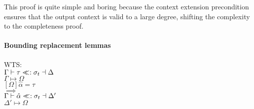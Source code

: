 \documentclass{article}
\newcommand{\alphahat}{\hat{\alpha}}
\newcommand{\sigbndr}{<\hspace{-5px}<:}
\begin{document}
This proof is quite simple and boring because the context extension precondition ensures that the output context is valid to a large degree, shifting the complexity to the completeness proof.

\paragraph{Bounding replacement lemmas}
\begin{tabbing}
WTS:\=\\
\>$\Gamma \vdash \tau \sigbndr \sigma_t \dashv \Delta$\\
\>$\Gamma \mapsto \Omega$\\
\>$[\Omega]\alphahat = \tau$\\
$\implies$\\
\>$\Gamma \vdash \alphahat \sigbndr \sigma_t \dashv \Delta'$\\
\>$\Delta' \mapsto \Omega$\\
\end{tabbing}
\end{document}
